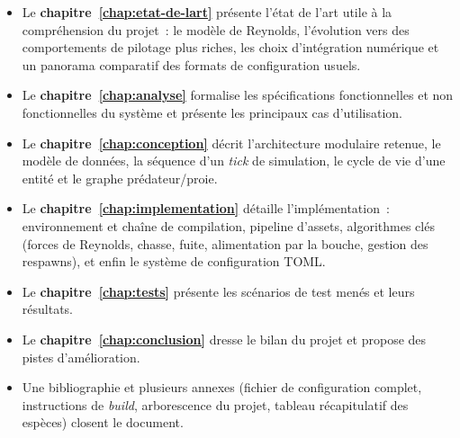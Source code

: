 \begin{itemize}[leftmargin=*]
  \item Le \textbf{chapitre~\ref{chap:etat-de-lart}} présente l'état
    de l'art utile à la compréhension du projet~: le modèle de
    Reynolds, l'évolution vers des comportements de pilotage plus
    riches, les choix d'intégration numérique et un panorama
    comparatif des formats de configuration usuels.

  \item Le \textbf{chapitre~\ref{chap:analyse}} formalise les
    spécifications fonctionnelles et non fonctionnelles du système
    et présente les principaux cas d'utilisation.

  \item Le \textbf{chapitre~\ref{chap:conception}} décrit
    l'architecture modulaire retenue, le modèle de données, la
    séquence d'un \emph{tick} de simulation, le cycle de vie d'une
    entité et le graphe prédateur/proie.

  \item Le \textbf{chapitre~\ref{chap:implementation}} détaille
    l'implémentation~: environnement et chaîne de compilation,
    pipeline d'assets, algorithmes clés (forces de Reynolds, chasse,
    fuite, alimentation par la bouche, gestion des respawns), et
    enfin le système de configuration TOML.

  \item Le \textbf{chapitre~\ref{chap:tests}} présente les scénarios
    de test menés et leurs résultats.

  \item Le \textbf{chapitre~\ref{chap:conclusion}} dresse le bilan
    du projet et propose des pistes d'amélioration.

  \item Une bibliographie et plusieurs annexes (fichier de
    configuration complet, instructions de \emph{build},
    arborescence du projet, tableau récapitulatif des espèces)
    closent le document.
\end{itemize}

